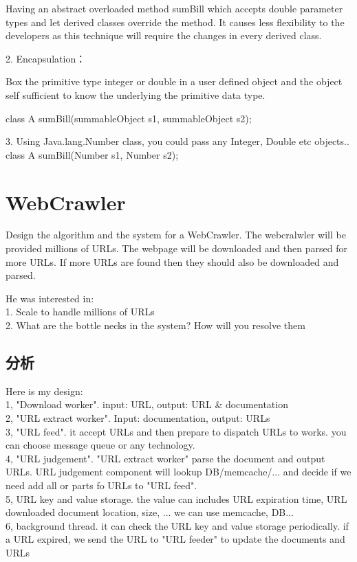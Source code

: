 Having an abstract overloaded method sumBill which accepts double parameter types and let derived classes override the method. It causes less flexibility to the developers as this 
technique will require the changes in every derived class. 

2. Encapsulation：

Box the primitive type integer or double in a user defined object and the object self sufficient to know the underlying the primitive data type. 

class A{ 
	sumBill(summableObject s1, summableObject s2); 
} 

3. Using Java.lang.Number class, you could pass any Integer, Double etc objects.. 
class A{ 
	sumBill(Number s1, Number s2); 
} 

\section{WebCrawler}
Design the algorithm and the system for a WebCrawler. 
The webcralwler will be provided millions of URLs. The webpage will be downloaded and then parsed for more URLs. If more URLs are found then they should also be downloaded and 
parsed. 

He was interested in: \\
1. Scale to handle millions of URLs \\
2. What are the bottle necks in the system? How will you resolve them

\subsection{分析}
Here is my design: \\
1, "Download worker". input: URL, output: URL \& documentation \\
2, "URL extract worker". Input: documentation, output: URLs \\
3, "URL feed". it accept URLs and then prepare to dispatch URLs to works. you can choose message queue or any technology. \\
4, "URL judgement". "URL extract worker" parse the document and output URLs. URL judgement component will lookup DB/memcache/... and decide if we need add all or parts fo URLs to 
"URL feed". \\
5, URL key and value storage. the value can includes URL expiration time, URL downloaded document location, size, ... we can use memcache, DB... \\
6, background thread. it can check the URL key and value storage periodically. if a URL expired, we send the URL to "URL feeder" to update the documents and URLs 

